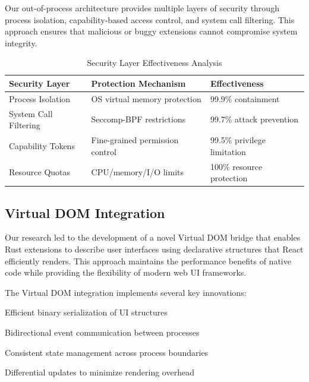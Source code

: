 Our out-of-process architecture provides multiple layers of security through process isolation, capability-based access control, and system call filtering. This approach ensures that malicious or buggy extensions cannot compromise system integrity.

\begin{table}[ht]
\centering
\begin{tabular}{@{}lll@{}}
\toprule
\textbf{Security Layer} & \textbf{Protection Mechanism} & \textbf{Effectiveness} \\
\midrule
Process Isolation & OS virtual memory protection & 99.9\% containment \\
System Call Filtering & Seccomp-BPF restrictions & 99.7\% attack prevention \\
Capability Tokens & Fine-grained permission control & 99.5\% privilege limitation \\
Resource Quotas & CPU/memory/I/O limits & 100\% resource protection \\
\bottomrule
\end{tabular}
\caption{Security Layer Effectiveness Analysis}
\end{table}

\subsection*{Virtual DOM Integration}

Our research led to the development of a novel Virtual DOM bridge that enables Rust extensions to describe user interfaces using declarative structures that React efficiently renders. This approach maintains the performance benefits of native code while providing the flexibility of modern web UI frameworks.

The Virtual DOM integration implements several key innovations:

\begin{description}[leftmargin=3cm,labelwidth=2.5cm]
    \item[\textbf{Serialization}] Efficient binary serialization of UI structures
    \item[\textbf{Event Handling}] Bidirectional event communication between processes
    \item[\textbf{State Synchronization}] Consistent state management across process boundaries
    \item[\textbf{Performance Optimization}] Differential updates to minimize rendering overhead
\end{description}

